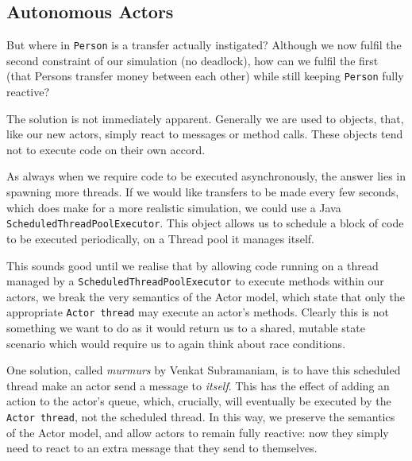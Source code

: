 \documentclass[a4paper,12pt]{kth-mag}
\begin{document}
\subsection{Autonomous Actors}

But where in \texttt{Person} is a transfer actually instigated? Although we now fulfil the second constraint of our simulation (no deadlock), how can we fulfil the first (that Persons transfer money between each other) while still keeping \texttt{Person} fully reactive?

The solution is not immediately apparent. Generally we are used to objects, that, like our new actors, simply react to messages or method calls. These objects tend not to execute code on their own accord. 

As always when we require code to be executed asynchronously, the answer lies in spawning more threads. If we would like transfers to be made every few seconds, which does make for a more realistic simulation, we could use a Java \texttt{ScheduledThreadPoolExecutor}. This object allows us to schedule a block of code to be executed periodically, on a Thread pool it manages itself.

This sounds good until we realise that by allowing code running on a thread managed by a \texttt{ScheduledThreadPoolExecutor} to execute methods within our actors, we break the very semantics of the Actor model, which state that only the appropriate \texttt{Actor thread} may execute an actor's methods. Clearly this is not something we want to do as it would return us to a shared, mutable state scenario which would require us to again think about race conditions.

One solution, called \textit{murmurs} by Venkat Subramaniam, is to have this scheduled thread make an actor send a message to \textit{itself}. This has the effect of adding an action to the actor's queue, which, crucially, will eventually be executed by the \texttt{Actor thread}, not the scheduled thread. In this way, we preserve the semantics of the Actor model, and allow actors to remain fully reactive: now they simply need to react to an extra message that they send to themselves.
\end{document}
